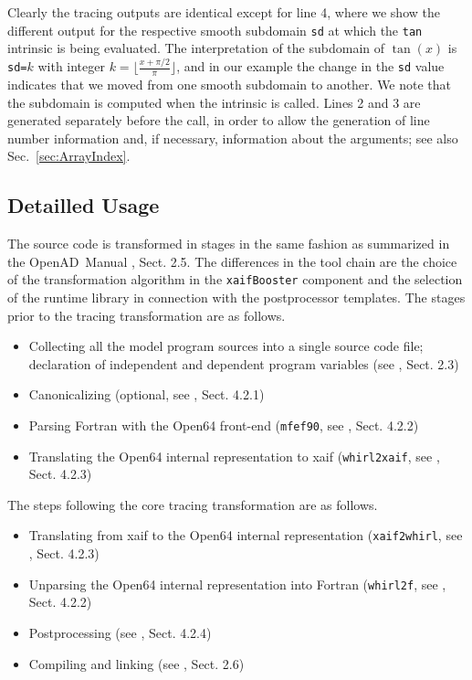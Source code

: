 \documentclass{article}
\newcommand{\openad}{OpenAD}
\newcommand{\refsec}[1]{{Sec.~\ref{#1}}}
\begin{document}
Clearly the tracing outputs are identical except for line 4, where we show the 
different output for the respective smooth subdomain \lstinline{sd} at which the 
\lstinline{tan} intrinsic is being evaluated. The interpretation of the subdomain of $\tan(x)$ 
is \lstinline{sd=}$k$ with integer $k=\lfloor\frac{x+\pi/2}{\pi}\rfloor$, and in our 
example the change in the \lstinline{sd} value  indicates that we moved from one smooth 
subdomain to another. 
We note that the subdomain is computed when the intrinsic is called. Lines 2 and 3 
are generated separately before the call, in order to allow the generation of line number information 
and, if necessary,  information about the arguments; see also \refsec{sec:ArrayIndex}.

\subsection{Detailled Usage}
The source code is transformed in stages in the same fashion as 
summarized in the \openad\ Manual \cite{userManual}, Sect. 2.5. 
The differences in the tool chain are the choice of the transformation algorithm 
in the \lstinline{xaifBooster} component and the selection of the runtime library in connection with 
the postprocessor templates. 
The stages prior to the tracing transformation are as follows.
\begin{itemize}
\item Collecting all the model program sources into a  single source code file; declaration of independent and dependent program variables (see \cite{userManual}, Sect. 2.3)
\item Canonicalizing (optional, see \cite{userManual}, Sect. 4.2.1)
\item Parsing Fortran with the Open64 front-end (\lstinline{mfef90}, see \cite{userManual}, Sect. 4.2.2)
\item Translating the Open64 internal representation to xaif (\lstinline{whirl2xaif}, see \cite{userManual}, Sect. 4.2.3)
\end{itemize}
The steps following the core tracing transformation are as follows.
\begin{itemize}
\item Translating from xaif to the Open64 internal representation (\lstinline{xaif2whirl}, see \cite{userManual}, Sect. 4.2.3)
\item Unparsing the Open64 internal representation into Fortran (\lstinline{whirl2f}, see \cite{userManual}, Sect. 4.2.2)
\item Postprocessing (see \cite{userManual}, Sect. 4.2.4)
\item Compiling and linking (see \cite{userManual}, Sect. 2.6)
\end{itemize}
\end{document}
